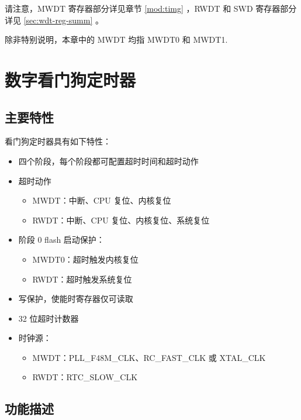 \documentclass[main\_\_CN.tex]{subfiles}
\begin{document}
请注意，MWDT 寄存器部分详见章节 \ref{mod:timg} \textit{}，RWDT 和 SWD 寄存器部分详见 \ref{sec:wdt-reg-summ} \textit{}。

\begin{tiplisting}
除非特别说明，本章中的 MWDT 均指 MWDT0 和 MWDT1.
\end{tiplisting}



\section{数字看门狗定时器}
\subsection{主要特性}
看门狗定时器具有如下特性：

\begin{itemize}
    \item 四个阶段，每个阶段都可配置超时时间和超时动作
    \item 超时动作
        \begin{itemize}
            \item MWDT：中断、CPU 复位、内核复位
            \item RWDT：中断、CPU 复位、内核复位、系统复位
        \end{itemize}
    \item 阶段 0 flash 启动保护：
        \begin{itemize}
            \item MWDT0：超时触发内核复位
            \item RWDT：超时触发系统复位
        \end{itemize}
    \item 写保护，使能时寄存器仅可读取
    \item 32 位超时计数器
    \item 时钟源：
        \begin{itemize}
            \item MWDT：PLL\_F48M\_CLK、RC\_FAST\_CLK 或 XTAL\_CLK
            \item RWDT：RTC\_SLOW\_CLK
        \end{itemize}

\end{itemize}

\subsection{功能描述}
\end{document}
